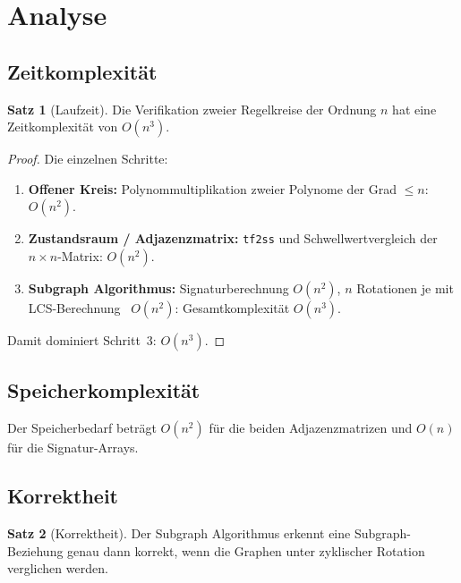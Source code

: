 \documentclass[a4paper,12pt]{article}
\theoremstyle{definition}
\newtheorem{satz}{Satz}
\begin{document}
\section{Analyse}
\label{sec:analyse}

\subsection{Zeitkomplexität}

\begin{satz}[Laufzeit]
Die Verifikation zweier Regelkreise der Ordnung $n$ hat eine Zeitkomplexität
von $O(n^3)$.
\end{satz}

\begin{proof}
Die einzelnen Schritte:
\begin{enumerate}
    \item \textbf{Offener Kreis:} Polynommultiplikation zweier Polynome
          der Grad $\leq n$: $O(n^2)$.
    \item \textbf{Zustandsraum / Adjazenzmatrix:} \texttt{tf2ss} und
          Schwellwertvergleich der $n \times n$-Matrix: $O(n^2)$.
    \item \textbf{Subgraph Algorithmus:}  Signaturberechnung $O(n^2)$,
          $n$ Rotationen je mit LCS-Berechnung~\cite{cormen} $O(n^2)$: Gesamtkomplexität $O(n^3)$.
\end{enumerate}
Damit dominiert Schritt~3: $O(n^3)$.
\end{proof}

\subsection{Speicherkomplexität}

Der Speicherbedarf beträgt $O(n^2)$ für die beiden Adjazenzmatrizen und $O(n)$
für die Signatur-Arrays.

\subsection{Korrektheit}

\begin{satz}[Korrektheit]
Der Subgraph Algorithmus erkennt eine Subgraph-Beziehung genau dann korrekt,
wenn die Graphen unter zyklischer Rotation verglichen werden.
\end{satz}
\end{document}
